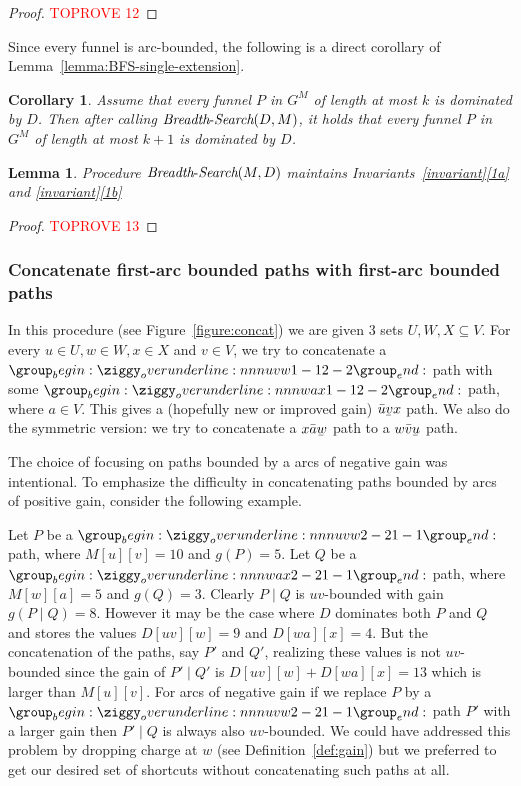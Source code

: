 \documentclass[11pt]{article}
\newtheorem{lemma}[theorem]{Lemma}
\newtheorem{corollary}[theorem]{Corollary}
\newcommand{\ubar}[1]{\underaccent{\bar}{{#1}}}
\newcommand{\BFS}{\mbox{{\it Breadth}-{\it Search}}}
\begin{document}
\begin{proof}\textcolor{red}{TOPROVE 12}\end{proof}

Since every funnel is arc-bounded, the following is a direct corollary of Lemma~\ref{lemma:BFS-single-extension}.

\begin{corollary}\label{lemma:BFS-basic}
    Assume that every funnel $P$ in $G^M$ of length at most $k$ is dominated by $D$.
    Then after calling $\BFS(D,M)$, it holds that every funnel $P$ in $G^M$ of length at most $k+1$ is dominated by $D$.
\end{corollary}

\begin{lemma}
    Procedure $\BFS(M,D)$ maintains Invariants~\ref{invariant}\ref{1a} and \ref{invariant}\ref{1b}
\end{lemma}

\begin{proof}\textcolor{red}{TOPROVE 13}\end{proof}


\subsubsection{Concatenate first-arc bounded paths with first-arc bounded paths}\label{section:concatenate}
In this procedure (see Figure~\ref{figure:concat}) we are given $3$ sets $U,W,X\subseteq V$. For every $u\in U,w\in W,x\in X$ and $v\in V$, we try to concatenate a $\overunderline{uvw}{1-1}{2-2}$ path with some $\overunderline{wax}{1-1}{2-2}$ path, where $a \in V$.
This gives  a (hopefully new or improved gain) $\bar{u}\ubar{v}x$ path. 
We also do the symmetric version: we try to concatenate a $x\bar{a}\ubar{w}$ path to a $w\bar{v}\ubar{u}$ path. 

The choice of focusing on  paths  bounded by a arcs of negative gain  was intentional. To emphasize the difficulty in concatenating   paths  bounded by arcs of positive gain, consider the following example.

Let $P$ be a $\overunderline{uvw}{2-2}{1-1}$ path, where $M[u][v] = 10$ and $g(P)=5$. Let $Q$ be a $\overunderline{wax}{2-2}{1-1}$ path, where $M[w][a] = 5$ and $g(Q)=3$. Clearly $P\mid Q$ is $uv$-bounded with gain $g(P\mid Q)=8$.
However it may be the case where $D$
 dominates both $P$ and $Q$ and stores the values $D[uv][w]=9$ and $D[wa][x]=4$.
 But the concatenation of the paths, say $P'$ and $Q'$, realizing these values is not $uv$-bounded since the gain of $P'\mid Q'$ is
  $D[uv][w] + D[wa][x]=13$ which is larger than $M[u][v]$. For arcs of negative gain  if we replace $P$ by a $\overunderline{uvw}{2-2}{1-1}$ path $P'$ with a larger gain then $P'\mid Q$ is always also 
  $uv$-bounded. We could have addressed this problem by dropping charge at $w$ (see Definition~\ref{def:gain}) but we preferred to  get our desired set of shortcuts without concatenating such paths at all.
\end{document}
